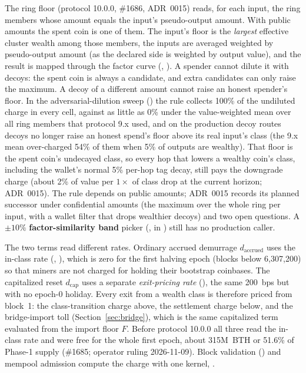 The ring floor (protocol 10.0.0, \#1686, ADR~0015) reads, for each input,
the ring members whose amount equals the input's pseudo-output amount. With
public amounts the spent coin is one of them. The input's floor is the
\emph{largest} effective cluster wealth among those members, the inputs are
averaged weighted by pseudo-output amount (as the declared side is weighted
by output value), and the result is mapped through the factor curve
(,
). A spender cannot dilute it with
decoys: the spent coin is always a candidate, and extra candidates can only
raise the maximum. A decoy of a different amount cannot raise an honest
spender's floor. In the adversarial-dilution sweep
() the rule collects 100\%
of the undiluted charge in every cell, against as little as 0\% under the
value-weighted mean over all ring members that protocol 9.x used, and on
the production decoy routes decoys no longer raise an honest spend's floor
above its real input's class (the 9.x mean over-charged 54\% of them when
5\% of outputs are wealthy). That floor is the spent coin's undecayed class,
so every hop that lowers a wealthy coin's class, including the wallet's
normal 5\% per-hop tag decay, still pays the downgrade charge (about 2\% of
value per $1\times$ of class drop at the current horizon; ADR~0015). The rule depends
on public amounts; ADR~0015 records its planned successor under confidential
amounts (the maximum over the whole ring per input, with a wallet filter that
drops wealthier decoys) and two open questions. A $\pm 10\%$
\textbf{factor-similarity band} picker (,
 in )
still has no production caller.

The two terms read different rates. Ordinary accrued demurrage
$d_{\text{accrued}}$ uses the in-class rate
(, ), which is
zero for the first halving epoch (blocks below 6,307,200) so that miners are
not charged for holding their bootstrap coinbases. The capitalized reset
$d_{\text{cap}}$ uses a separate \emph{exit-pricing rate}
(), the same 200~bps but with no epoch-0
holiday. Every exit from a wealth class is therefore priced from block~1:
the class-transition charge above, the settlement charge below, and the
bridge-import toll (Section~\ref{sec:bridge}), which is the same capitalized
term evaluated from the import floor $F$. Before protocol 10.0.0 all three read
the in-class rate and were free for the whole first epoch, about 315M~BTH or
51.6\% of Phase-1 supply (\#1685; operator ruling 2026-11-09). Block
validation () and mempool admission compute the
charge with one kernel, .

